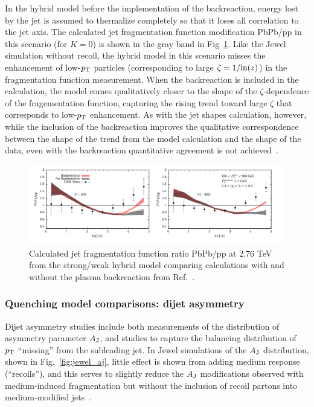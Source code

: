 In the hybrid model before the implementation of the backreaction, energy lost by the jet is assumed to thermalize completely so that it loses all correlation to the jet axis.  The calculated jet fragmentation function modification PbPb/pp in this scenario (for $K = 0$) is shown in the gray band in Fig~\ref{fig:Hybrid_JFF}.  Like the {\sc Jewel} simulation without recoil, the hybrid model in this scenario misses the enhancement of low-$p_{\rm T}$ particles (corresponding to large $\zeta = 1/{\rm ln}(z)$) in the fragmentation function measurement.  When the backreaction is included in the calculation, the model comes qualitatively closer to the shape of the $\zeta$-dependence of the fragementation function, capturing the rising trend toward large $\zeta$ that corresponds to low-$p_{\rm T}$ enhancement.  As with the jet shapes calculation, however, while the inclusion of the backreaction improves the qualitative correspondence between the shape of the trend from the model calculation and the shape of the data, even with the backreaction quantitative agreement is not achieved~\cite{Casalderrey-Solana:2016jvj}. 

\begin{figure}[h!]
\begin{center}
\includegraphics[width=0.99\textwidth]{figures/Models/Hybrid_JFF.png}
\caption[Calculated JFF ratio PbPb/pp at 2.76 TeV from the hybrid model]{Calculated jet fragmentation function ratio PbPb/pp at 2.76 TeV from the strong/weak hybrid model comparing calculations with and without the plasma backreaction from Ref.~\cite{Casalderrey-Solana:2016jvj}.}
\label{fig:Hybrid_JFF}
\end{center}
\end{figure}



\subsubsection{Quenching model comparisons: dijet asymmetry}
 \label{sec:theory_dijet_balance}
 
 Dijet asymmetry studies include both measurements of the distribution of asymmetry parameter $A_{\rm J}$, and studies to capture the balancing distribution of $p_{\rm T}$ ``missing'' from the subleading jet.  In {\sc Jewel} simulations of the $A_{\rm J}$ distribution, shown in Fig.~\ref{fig:jewel_aj}, little effect is shown from adding medium response (``recoils''), and this serves to slightly reduce the $A_{\rm J}$ modifications observed with medium-induced fragmentation but without the inclusion of recoil partons into medium-modified jets~\cite{Elayavalli:2017hxo}.
 
